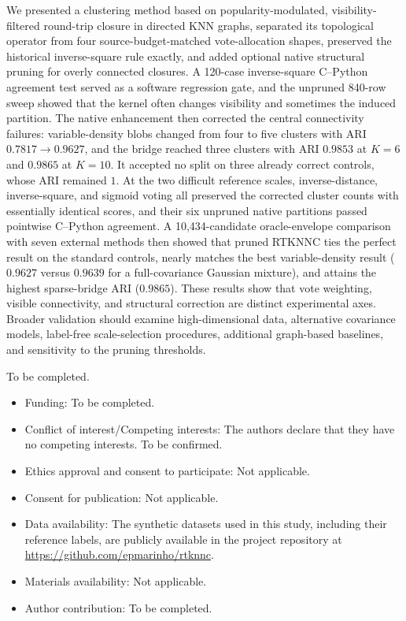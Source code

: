 \documentclass[pdflatex,sn-mathphys-num]{sn-jnl}
\begin{document}
We presented a clustering method based on popularity-modulated,
visibility-filtered round-trip closure in directed KNN graphs, separated its
topological operator from four source-budget-matched vote-allocation shapes,
preserved the historical inverse-square rule exactly, and added optional native
structural pruning for overly connected closures.  A 120-case inverse-square
C--Python agreement test served as a software regression gate, and the
unpruned 840-row sweep showed that the kernel often changes visibility and
sometimes the induced partition.  The native enhancement then corrected the
central connectivity failures: variable-density blobs changed from four to
five clusters with ARI $0.7817\to0.9627$, and the bridge reached three clusters
with ARI $0.9853$ at $K=6$ and $0.9865$ at $K=10$.  It accepted no split on
three already correct controls, whose ARI remained $1$.  At the two difficult
reference scales, inverse-distance, inverse-square, and sigmoid voting all
preserved the corrected cluster counts with essentially identical scores, and
their six unpruned native partitions passed pointwise C--Python agreement.
A 10,434-candidate oracle-envelope comparison with seven external methods then
showed that pruned RTKNNC ties the perfect result on the standard controls,
nearly matches the best variable-density result ($0.9627$ versus $0.9639$ for
a full-covariance Gaussian mixture), and attains the highest sparse-bridge ARI
($0.9865$).  These results show that vote weighting, visible connectivity, and
structural correction are distinct experimental axes.  Broader validation
should examine high-dimensional data, alternative covariance models,
label-free scale-selection procedures, additional graph-based baselines, and
sensitivity to the pruning thresholds.

\backmatter

To be completed.

\begin{itemize}
\item Funding: To be completed.
\item Conflict of interest/Competing interests: The authors declare that they have no competing interests. To be confirmed.
\item Ethics approval and consent to participate: Not applicable.
\item Consent for publication: Not applicable.
\item Data availability: The synthetic datasets used in this study, including their reference labels, are publicly available in the project repository at \url{https://github.com/epmarinho/rtknnc}.
\item Materials availability: Not applicable.
\item Author contribution: To be completed.
\end{itemize}


\end{document}
